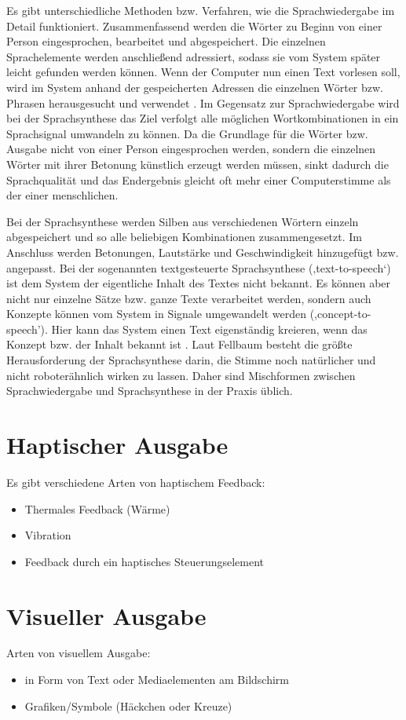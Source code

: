 Es gibt unterschiedliche Methoden bzw. Verfahren, wie die Sprachwiedergabe im Detail funktioniert. Zusammenfassend werden die Wörter zu Beginn von einer Person eingesprochen, bearbeitet und abgespeichert. Die einzelnen Sprachelemente werden anschließend adressiert, sodass sie vom System später leicht gefunden werden können. Wenn der Computer nun einen Text vorlesen soll, wird im System anhand der gespeicherten Adressen die einzelnen Wörter bzw. Phrasen herausgesucht und verwendet \cite{FellbaumSprache}.
\newline \newline
Im Gegensatz zur Sprachwiedergabe wird bei der Sprachsynthese das Ziel verfolgt alle möglichen Wortkombinationen in ein Sprachsignal umwandeln zu können. Da die Grundlage für die Wörter bzw. Ausgabe nicht von einer Person eingesprochen werden, sondern die einzelnen Wörter mit ihrer Betonung künstlich erzeugt werden müssen, sinkt dadurch die Sprachqualität und das Endergebnis gleicht oft mehr einer Computerstimme als der einer menschlichen. 

Bei der Sprachsynthese werden Silben aus verschiedenen Wörtern einzeln abgespeichert und so alle beliebigen Kombinationen zusammengesetzt. Im Anschluss werden Betonungen, Lautstärke und Geschwindigkeit hinzugefügt bzw. angepasst. Bei der sogenannten textgesteuerte Sprachsynthese (‚text-to-speech‘) ist dem System der eigentliche Inhalt des Textes nicht bekannt. Es können aber nicht nur einzelne Sätze bzw. ganze Texte verarbeitet werden, sondern auch Konzepte können vom System in Signale umgewandelt werden (,concept-to-speech'). Hier kann das System einen Text eigenständig kreieren, wenn das Konzept bzw. der Inhalt bekannt ist \cite{FellbaumSprache}.
\newline \newline
Laut Fellbaum \cite{FellbaumSprache} besteht die größte Herausforderung der Sprachsynthese darin, die Stimme noch natürlicher und nicht roboterähnlich wirken zu lassen. Daher sind Mischformen zwischen Sprachwiedergabe und Sprachsynthese in der Praxis üblich. 

\section{Haptischer Ausgabe}
Es gibt verschiedene Arten von haptischem Feedback:
\begin{itemize}
      \item Thermales Feedback (Wärme)
      \item Vibration
			\item Feedback durch ein haptisches Steuerungselement
\end{itemize}

\section{Visueller Ausgabe}
Arten von visuellem Ausgabe:
\begin{itemize}
      \item in Form von Text oder Mediaelementen am Bildschirm
      \item Grafiken/Symbole (Häckchen oder Kreuze)
\end{itemize}




